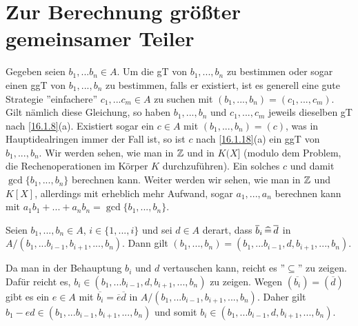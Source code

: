 \documentclass[../../main.tex]{subfiles}
\begin{document}
\section{Zur Berechnung größter gemeinsamer Teiler}

Gegeben seien $b_1,...b_n\in A$. Um die gT von $b_1,...,b_n$ zu bestimmen oder sogar einen ggT von $b_1,...,b_n$ zu bestimmen, falls er existiert, ist es generell eine gute Strategie ''einfachere'' $c_1,...c_m\in A$ zu suchen mit $(b_1,...,b_n)=(c_1,...,c_m)$.
Gilt nämlich diese Gleichung, so haben $b_1,...,b_n$ und $c_1,...,c_m$ jeweils dieselben gT nach \ref{16.1.8}(a). Existiert sogar ein $c\in A$ mit $(b_1,...,b_n)=(c)$, was in Hauptidealringen immer der Fall ist, so ist $c$ nach \ref{16.1.18}(a) ein ggT von $b_1,...,b_n$. Wir werden sehen, wie man in $\mathbb Z$ und in $K(X]$ (modulo dem Problem, die Rechenoperationen im Körper $K$ durchzuführen). Ein solches $c$ und damit $\gcd\{b_1,...,b_n\}$ berechnen kann. Weiter werden wir sehen, wie man in $\mathbb Z$ und $K[X]$, allerdings mit erheblich mehr Aufwand, sogar $a_1,...,a_n$ berechnen kann mit $a_1b_1+...+a_nb_n=\gcd\{b_1,...,b_n\}$.

\begin{sat}\label{16.3.1}
Seien $b_1,...,b_n\in A$, $i\in\{1,...,i\}$ und sei $d\in A$ derart, dass $\overline b_i\,\widehat{=}\, \overline d$ in $A/(b_1,...b_{i-1},b_{i+1},...,b_n)$. Dann gilt $(b_1,...,b_n)=(b_1,...b_{i-1},d,b_{i+1},...,b_n)$.
\end{sat}
\begin{cproof}
Da man in der Behauptung $b_i$ und $d$ vertauschen kann, reicht es ''$\subseteq$'' zu zeigen. Dafür reicht es, $b_i\in (b_1,...b_{i-1},d,b_{i+1},...,b_n)$ zu zeigen. Wegen $(\overline{b_i})=(\overline{d})$ gibt es ein $e\in A$ mit $\overline{b_i}=\overline{e}\overline{d}$ in $A/(b_1,...b_{i-1},b_{i+1},...,b_n)$. Daher gilt $b_1-ed\in (b_1,...b_{i-1},b_{i+1},...,b_n)$ und somit $b_i\in (b_1,...b_{i-1},d,b_{i+1},...,b_n)$.
\end{cproof}
\end{document}
